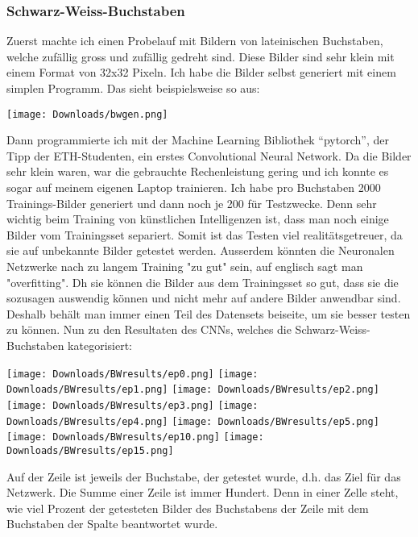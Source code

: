 \documentclass[11pt,a4paper,ngerman]{article}
\begin{document}
\subsubsection{Schwarz-Weiss-Buchstaben}

Zuerst machte ich einen Probelauf mit Bildern von lateinischen Buchstaben, welche zufällig gross und zufällig gedreht sind. Diese Bilder sind sehr klein mit einem Format von 32x32 Pixeln. Ich habe die Bilder selbst generiert mit einem simplen Programm. Das sieht beispielsweise so aus:

\begin{center}
    \texttt{[image: Downloads/bwgen.png]}
\end{center}

Dann programmierte ich mit der Machine Learning Bibliothek \enquote{pytorch}, der Tipp der ETH-Studenten, ein erstes Convolutional Neural Network. Da die Bilder sehr klein waren, war die gebrauchte Rechenleistung gering und ich konnte es sogar auf meinem eigenen Laptop trainieren. Ich habe pro Buchstaben 2000 Trainings-Bilder generiert und dann noch je 200 für Testzwecke. Denn sehr wichtig beim Training von künstlichen Intelligenzen ist, dass man noch einige Bilder vom Trainingsset separiert. Somit ist das Testen viel realitätsgetreuer, da sie auf unbekannte Bilder getestet werden. Ausserdem könnten die Neuronalen Netzwerke nach zu langem Training "zu gut" sein, auf englisch sagt man "overfitting". Dh sie können die Bilder aus dem Trainingsset so gut, dass sie die sozusagen auswendig können und nicht mehr auf andere Bilder anwendbar sind. Deshalb behält man immer einen Teil des Datensets beiseite, um sie besser testen zu können. Nun zu den Resultaten des CNNs, welches die Schwarz-Weiss-Buchstaben kategorisiert:

\begin{center}
    \texttt{[image: Downloads/BWresults/ep0.png]}
    \texttt{[image: Downloads/BWresults/ep1.png]}
    \texttt{[image: Downloads/BWresults/ep2.png]}
    \texttt{[image: Downloads/BWresults/ep3.png]}
    \texttt{[image: Downloads/BWresults/ep4.png]}
    \texttt{[image: Downloads/BWresults/ep5.png]}
    \texttt{[image: Downloads/BWresults/ep10.png]}
    \texttt{[image: Downloads/BWresults/ep15.png]}
\end{center}

Auf der Zeile ist jeweils der Buchstabe, der getestet wurde, d.h. das Ziel für das Netzwerk. Die Summe einer Zeile ist immer Hundert. Denn in einer Zelle steht, wie viel Prozent der getesteten Bilder des Buchstabens der Zeile mit dem Buchstaben der Spalte beantwortet wurde.
\end{document}
